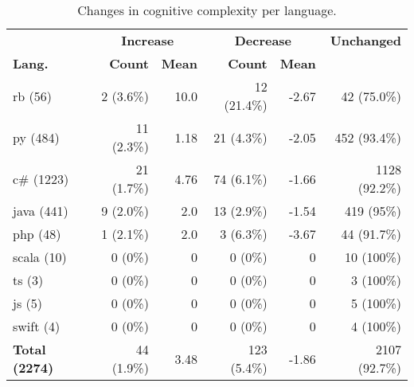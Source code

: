 \begin{table}[t]
\centering
    \setlength{\tabcolsep}{4pt}
    \caption{Changes in cognitive complexity per language.}
    \begin{tabular}{lrrrrr}
        \toprule
        &\multicolumn{2}{c}{\textbf{Increase}}&\multicolumn{2}{c}{\textbf{Decrease}}&\textbf{Unchanged}\\
        \textbf{Lang.}&\textbf{Count}&\textbf{Mean}&\textbf{Count}&\textbf{Mean}&\\
        \midrule
        rb (56)&2 (3.6\%)&10.0&12 (21.4\%)&-2.67&42 (75.0\%)\\
        py (484)&11 (2.3\%)&1.18&21 (4.3\%)&-2.05&452 (93.4\%)\\
        c\# (1223)&21 (1.7\%)&4.76&74 (6.1\%)&-1.66&1128 (92.2\%)\\
        java (441)&9 (2.0\%)&2.0&13 (2.9\%)&-1.54&419 (95\%)\\
        php (48)&1 (2.1\%)&2.0&3 (6.3\%)&-3.67&44 (91.7\%)\\
        scala (10)&0 (0\%)&0&0 (0\%)&0&10 (100\%)\\
        ts (3)&0 (0\%)&0&0 (0\%)&0&3 (100\%)\\
        js (5)&0 (0\%)&0&0 (0\%)&0&5 (100\%)\\
        swift (4)&0 (0\%)&0&0 (0\%)&0&4 (100\%)\\
        \midrule
        \textbf{Total (2274)}&44 (1.9\%)& 3.48 & 123 (5.4\%)& -1.86 & 2107 (92.7\%)\\

        \bottomrule
    \end{tabular}
\label{tab:cognitive_complexity}
\end{table}




